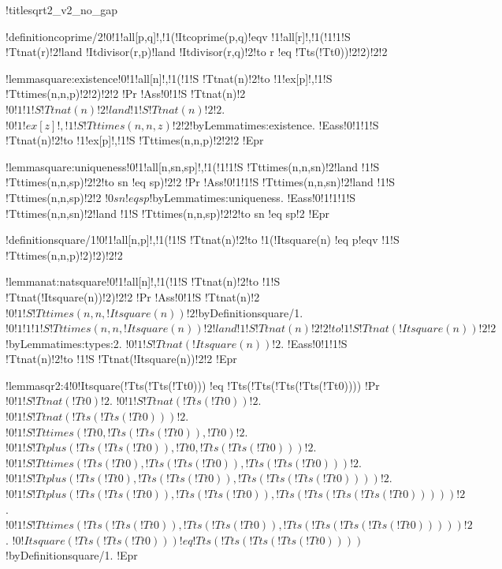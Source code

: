 
!title{sqrt2_v2_no_gap}

!definition{coprime/2}{!0!1!all[p,q]!,!1(!It{coprime}(p,q)!eqv !1!all[r]!,!1(!1!1!S !Tt{nat}(r)!2!land !It{divisor}(r,p)!land !It{divisor}(r,q)!2!to r !eq !Tt{s}(!Tt{0}))!2!2)!2!2}

!lemma{square:existence}{!0!1!all[n]!,!1(!1!S !Tt{nat}(n)!2!to !1!ex[p]!,!1!S !Tt{times}(n,n,p)!2!2)!2!2}
!Pr{
!Ass{!0!1!S !Tt{nat}(n)!2}
$!0!1!1!S !Tt{nat}(n)!2!land !1!S !Tt{nat}(n)!2!2$.
$!0!1!ex[z]!,!1!S !Tt{times}(n,n,z)!2!2$!by{Lemma}{times:existence}.
!Eass{!0!1!1!S !Tt{nat}(n)!2!to !1!ex[p]!,!1!S !Tt{times}(n,n,p)!2!2!2}}
!Epr

!lemma{square:uniqueness}{!0!1!all[n,sn,sp]!,!1(!1!1!S !Tt{times}(n,n,sn)!2!land !1!S !Tt{times}(n,n,sp)!2!2!to sn !eq sp)!2!2}
!Pr{
!Ass{!0!1!1!S !Tt{times}(n,n,sn)!2!land !1!S !Tt{times}(n,n,sp)!2!2}
$!0sn !eq sp$!by{Lemma}{times:uniqueness}.
!Eass{!0!1!1!1!S !Tt{times}(n,n,sn)!2!land !1!S !Tt{times}(n,n,sp)!2!2!to sn !eq sp!2}}
!Epr

!definition{square/1}{!0!1!all[n,p]!,!1(!1!S !Tt{nat}(n)!2!to !1(!It{square}(n) !eq p!eqv !1!S !Tt{times}(n,n,p)!2)!2)!2!2}

!lemma{nat:natsquare}{!0!1!all[n]!,!1(!1!S !Tt{nat}(n)!2!to !1!S !Tt{nat}(!It{square}(n))!2)!2!2}
!Pr{
!Ass{!0!1!S !Tt{nat}(n)!2}
$!0!1!S !Tt{times}(n,n,!It{square}(n))!2$!by{Definition}{square/1}.
$!0!1!1!1!S !Tt{times}(n,n,!It{square}(n))!2!land !1!S !Tt{nat}(n)!2!2!to !1!S !Tt{nat}(!It{square}(n))!2!2$!by{Lemma}{times:types:2}.
$!0!1!S !Tt{nat}(!It{square}(n))!2$.
!Eass{!0!1!1!S !Tt{nat}(n)!2!to !1!S !Tt{nat}(!It{square}(n))!2!2}}
!Epr

!lemma{sqr2:4}{!0!It{square}(!Tt{s}(!Tt{s}(!Tt{0}))) !eq !Tt{s}(!Tt{s}(!Tt{s}(!Tt{s}(!Tt{0}))))}
!Pr{
$!0!1!S !Tt{nat}(!Tt{0})!2$.
$!0!1!S !Tt{nat}(!Tt{s}(!Tt{0}))!2$.
$!0!1!S !Tt{nat}(!Tt{s}(!Tt{s}(!Tt{0})))!2$.
$!0!1!S !Tt{times}(!Tt{0},!Tt{s}(!Tt{s}(!Tt{0})),!Tt{0})!2$.
$!0!1!S !Tt{plus}(!Tt{s}(!Tt{s}(!Tt{0})),!Tt{0},!Tt{s}(!Tt{s}(!Tt{0})))!2$.
$!0!1!S !Tt{times}(!Tt{s}(!Tt{0}),!Tt{s}(!Tt{s}(!Tt{0})),!Tt{s}(!Tt{s}(!Tt{0})))!2$.
$!0!1!S !Tt{plus}(!Tt{s}(!Tt{0}),!Tt{s}(!Tt{s}(!Tt{0})),!Tt{s}(!Tt{s}(!Tt{s}(!Tt{0}))))!2$.
$!0!1!S !Tt{plus}(!Tt{s}(!Tt{s}(!Tt{0})),!Tt{s}(!Tt{s}(!Tt{0})),!Tt{s}(!Tt{s}(!Tt{s}(!Tt{s}(!Tt{0})))))!2$.
$!0!1!S !Tt{times}(!Tt{s}(!Tt{s}(!Tt{0})),!Tt{s}(!Tt{s}(!Tt{0})),!Tt{s}(!Tt{s}(!Tt{s}(!Tt{s}(!Tt{0})))))!2$.
$!0!It{square}(!Tt{s}(!Tt{s}(!Tt{0}))) !eq !Tt{s}(!Tt{s}(!Tt{s}(!Tt{s}(!Tt{0}))))$!by{Definition}{square/1}.}
!Epr

